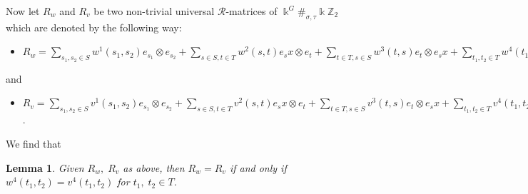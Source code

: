 \documentclass[a4paper,11pt]{amsart}
\numberwithin{equation}{section}
\newtheorem{lemma}[theorem]{Lemma}
\begin{document}
Now let $R_w$ and $R_v$ be two non-trivial universal $\mathcal{R}$-matrices of $\Bbbk^G\#_{\sigma,\tau}\Bbbk \mathbb{Z}_{2}$ which are denoted by the following way:
\begin{itemize}
              \item[] $R_w=\sum\limits_{s_1,s_2 \in S}w^1(s_1,s_2)e_{s_1} \otimes e_{s_2}+ \sum\limits_{s \in S, t \in T}w^2(s,t)e_{s}x \otimes e_{t}+
        \sum\limits_{t \in T,s \in S}w^3(t,s)e_{t} \otimes e_{s}x+
         \sum\limits_{t_1,t_2 \in T}w^4(t_1,t_2)e_{t_1}x \otimes e_{t_2}x$
\end{itemize}
and
\begin{itemize}
              \item[] $R_v=\sum\limits_{s_1,s_2 \in S}v^1(s_1,s_2)e_{s_1} \otimes e_{s_2}+ \sum\limits_{s \in S, t \in T}v^2(s,t)e_{s}x \otimes e_{t}+
        \sum\limits_{t \in T,s \in S}v^3(t,s)e_{t} \otimes e_{s}x+
         \sum\limits_{t_1,t_2 \in T}v^4(t_1,t_2)e_{t_1}x \otimes e_{t_2}x$.
\end{itemize}
We find that
\begin{lemma}\label{lem3.2}
 Given $R_w,\;R_v$ as above, then $R_w=R_v$ if and only if $w^4(t_1,t_2)=v^4(t_1,t_2)$ for $t_1,\;t_2\in T$.
\end{lemma}
\end{document}
